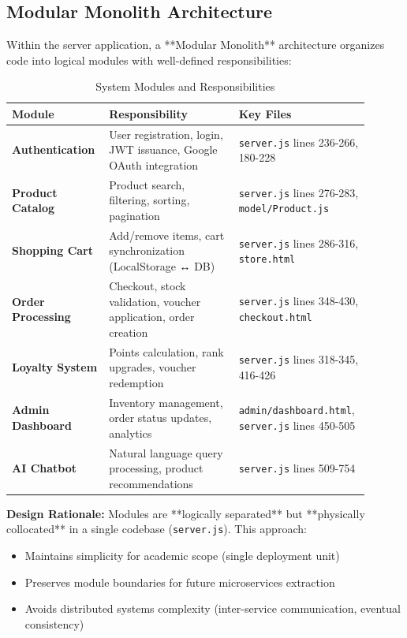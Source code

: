 \subsection{Modular Monolith Architecture}

Within the server application, a **Modular Monolith** architecture organizes code into logical modules with well-defined responsibilities:

\begin{table}[H]
\centering
\caption{System Modules and Responsibilities}
\label{tab:modules}
\begin{tabular}{@{}p{0.25\linewidth}p{0.35\linewidth}p{0.30\linewidth}@{}}
\toprule
\textbf{Module} & \textbf{Responsibility} & \textbf{Key Files} \\
\midrule
\textbf{Authentication} & User registration, login, JWT issuance, Google OAuth integration & \texttt{server.js} lines 236-266, 180-228 \\
\textbf{Product Catalog} & Product search, filtering, sorting, pagination & \texttt{server.js} lines 276-283, \texttt{model/Product.js} \\
\textbf{Shopping Cart} & Add/remove items, cart synchronization (LocalStorage ↔ DB) & \texttt{server.js} lines 286-316, \texttt{store.html} \\
\textbf{Order Processing} & Checkout, stock validation, voucher application, order creation & \texttt{server.js} lines 348-430, \texttt{checkout.html} \\
\textbf{Loyalty System} & Points calculation, rank upgrades, voucher redemption & \texttt{server.js} lines 318-345, 416-426 \\
\textbf{Admin Dashboard} & Inventory management, order status updates, analytics & \texttt{admin/dashboard.html}, \texttt{server.js} lines 450-505 \\
\textbf{AI Chatbot} & Natural language query processing, product recommendations & \texttt{server.js} lines 509-754 \\
\bottomrule
\end{tabular}
\end{table}

\textbf{Design Rationale:} Modules are **logically separated** but **physically collocated** in a single codebase (\texttt{server.js}). This approach:
\begin{itemize}
    \item Maintains simplicity for academic scope (single deployment unit)
    \item Preserves module boundaries for future microservices extraction
    \item Avoids distributed systems complexity (inter-service communication, eventual consistency)
\end{itemize}

